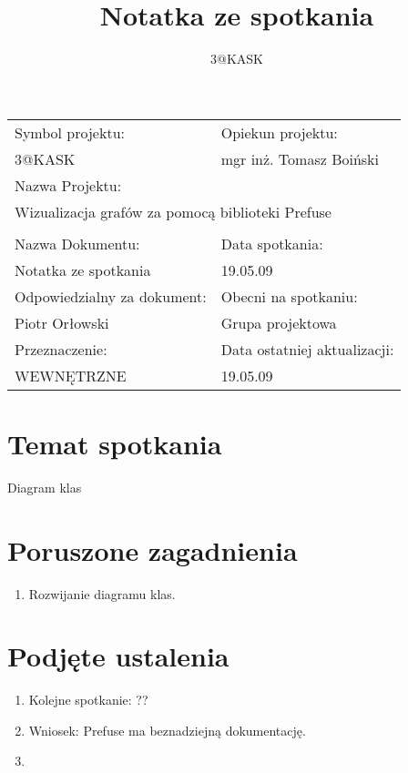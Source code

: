 \documentclass[a4paper,10pt]{article}
\title{Notatka ze spotkania}
\author{3@KASK}
\begin{document}



\maketitle


\begin{center}
\begin{tabular}{|p{7cm}|p{7cm}|}
\hline
Symbol projektu: & Opiekun projektu:   \tabularnewline 
3@KASK & mgr inż. Tomasz Boiński    \tabularnewline \hline
\multicolumn{2}{|l|}{Nazwa Projektu: } \tabularnewline
\multicolumn{2}{|l|}{Wizualizacja grafów za pomocą biblioteki Prefuse } \tabularnewline 
\hline
\multicolumn{2}{l}{ } \tabularnewline %
\hline 
Nazwa Dokumentu: & Data spotkania:   \tabularnewline 
Notatka ze spotkania & 19.05.09 \tabularnewline \hline
Odpowiedzialny za dokument: & Obecni na spotkaniu:   \tabularnewline 
Piotr Orłowski & Grupa projektowa \tabularnewline \hline
Przeznaczenie: & Data ostatniej aktualizacji:   \tabularnewline 
WEWNĘTRZNE & 19.05.09 \tabularnewline \hline
\end{tabular}
\end{center}



\section{Temat spotkania}
Diagram klas

\section{Poruszone zagadnienia}
\begin{enumerate}
\item Rozwijanie diagramu klas.
\end{enumerate}


\section{Podjęte ustalenia}
\begin{enumerate}
\item  Kolejne spotkanie: ??
\item Wniosek: Prefuse ma beznadziejną dokumentację.
\item 
\end{enumerate}



\clearpage
{}
{}

\end{document}
